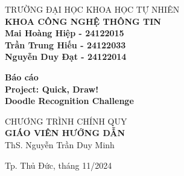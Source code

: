 \begin{titlepage}
\pagebreak



\begin{center}

TRƯỜNG ĐẠI HỌC KHOA HỌC TỰ NHIÊN\\
\textbf{KHOA CÔNG NGHỆ THÔNG TIN}\\[2cm]


{\large \bfseries Mai Hoàng Hiệp - 24122015\\} 
{\large \bfseries Trần Trung Hiếu - 24122033\\}
{\large \bfseries Nguyễn Duy Đạt - 24122014\\[2cm]} 


{ \Large \bfseries Báo cáo \\Project: Quick, Draw! \\Doodle Recognition Challenge\\[3cm] } 


\large CHƯƠNG TRÌNH CHÍNH QUY\\[2cm]

\textbf{GIÁO VIÊN HƯỚNG DẪN}\\
ThS. Nguyễn Trần Duy Minh\\


\vfill
Tp. Thủ Đức, tháng 11/2024

\end{center}

\end{titlepage}